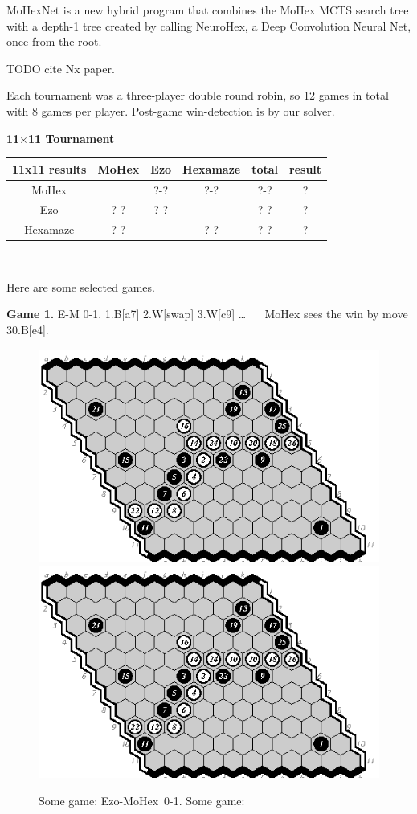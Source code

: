 \documentclass{icga}
\def\Eo{\mbox{\sc Ezo}}
\def\Hz{\mbox{\sc Hexamaze}}
\def\Mx{\mbox{\sc MoHex}}
\def\Mt{\mbox{\sc MoHexNet}}
\def\Nx{\mbox{\sc NeuroHex}}
\begin{document}
\Mt{} is a new hybrid program that combines
the \Mx{} MCTS search tree with a 
depth-1 tree created by calling \Nx{}, 
a Deep Convolution Neural Net, once from the root.

TODO cite Nx paper.

Each tournament was a three-player double round robin, so 12 games
in total with 8 games per player.
Post-game win-detection is by our solver.

{\large\bf 11$\times$11 Tournament}

\hfill\begin{tabular}{|c|c|c|c|c|c|}
\hline 11x11 results &\Mx{} &\Eo{} & \Hz{}     & total & result \\ 
\hline \Mx{} &      &  ?-?    &  ?-?      & ?-?  &  ? \\
\hline \Eo{} &  ?-? &  ?-?    &           & ?-?  &  ? \\
\hline \Hz{} &  ?-? &         &  ?-?      & ?-?  &  ? \\
\hline
\end{tabular}\hfill~

Here are some selected games.

{\bf Game 1.}
{\sc E-M 0-1.}
1.B[a7] 2.W[swap] 3.W[c9] \ldots ~ ~
\Mx{} sees the win by move 30.B[e4].

\begin{figure}[hbp]
\includegraphics[scale=1.3]{0556.eps}\hspace*{-1cm}\includegraphics[scale=1.3]{0556.eps}
\caption{Some game: \Eo-\Mx\ 0-1. Some game: }
\end{figure}
\end{document}
